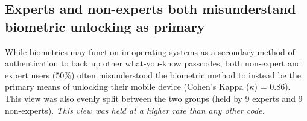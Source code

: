 \subsection{Experts and non-experts both misunderstand biometric unlocking as primary}
While biometrics may function in operating systems as a secondary method of
authentication to back up other what-you-know passcodes, both non-expert and
expert users (50\%) often misunderstood the biometric method to instead be the
primary means of unlocking their mobile device (Cohen's Kappa (\(\kappa\)) =
0.86). This view was also evenly split between the two groups (held by 9 experts
and 9 non-experts). {\em This view was held at a higher rate than any other
code.} 


%

